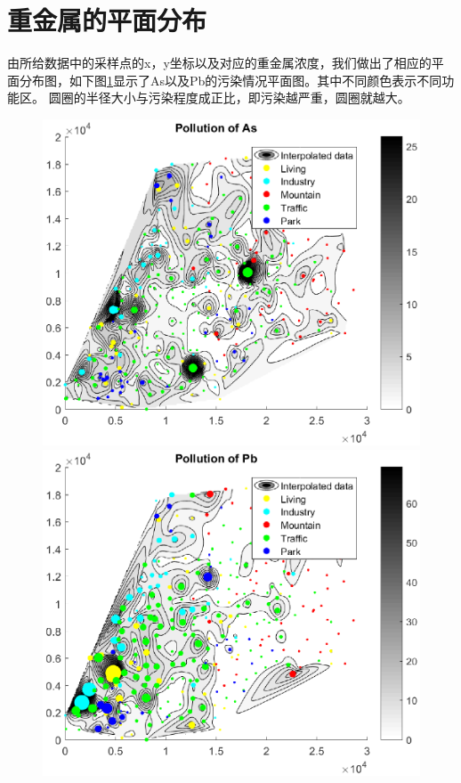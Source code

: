 \documentclass[a4paper]{article}
\begin{document}
\section{重金属的平面分布}
由所给数据中的采样点的x，y坐标以及对应的重金属浓度，我们做出了相应的平面分布图，如下图\ref{fig:char}显示了As以及Pb的污染情况平面图。其中不同颜色表示不同功能区。
圆圈的半径大小与污染程度成正比，即污染越严重，圆圈就越大。
\begin{figure}[h]
	\begin{minipage}[t]{0.5\linewidth}
    \centering
    \includegraphics[scale=0.5]{pictures/pollution-of-As.eps}
    \end{minipage}
    \begin{minipage}[t]{0.5\linewidth}
    \centering 
	\includegraphics[scale=0.5]{pictures/pollution-of-Pb.eps}
    \end{minipage}
    \label{fig:char}
\end{figure}
\end{document}
